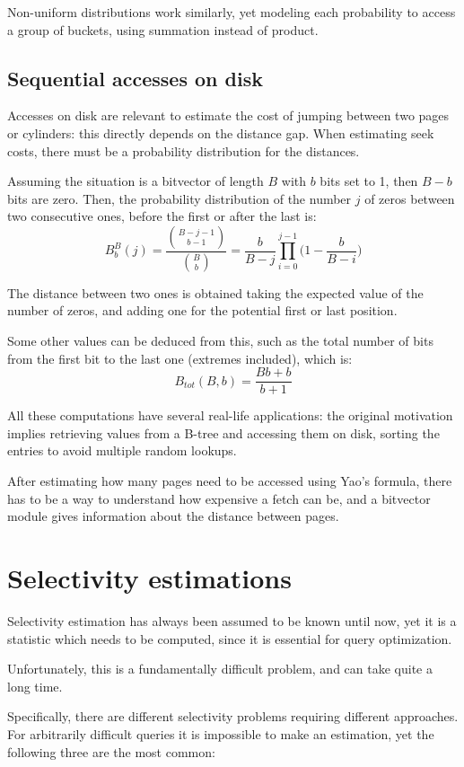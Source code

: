 Non-uniform distributions work similarly, yet modeling each probability to access a group of buckets, using summation instead of product. 

\subsection{Sequential accesses on disk}
Accesses on disk are relevant to estimate the cost of jumping between two pages or cylinders: this directly depends on the distance gap. When estimating seek costs, there must be a probability distribution for the distances.  

Assuming the situation is a bitvector of length $B$ with $b$ bits set to 1, then $B - b$ bits are zero. Then, the probability distribution of the number $j$ of zeros between two consecutive ones, before the first or after the last is:
$$B^B_b(j) = \frac{{B-j-1\choose b-1}}{{B\choose b}} = \frac{b}{B-j}\prod_{i=0}^{j-1} \Big( 1 - \frac{b}{B - i}\Big)$$

The distance between two ones is obtained taking the expected value of the number of zeros, and adding one for the potential first or last position.

Some other values can be deduced from this, such as the total number of bits from the first bit to the last one (extremes included), which is:
$$B_{tot}(B, b) = \frac{Bb + b}{b + 1}$$

All these computations have several real-life applications: the original motivation implies retrieving values from a B-tree and accessing them on disk, sorting the entries to avoid multiple random lookups. 

After estimating how many pages need to be accessed using Yao's formula, there has to be a way to understand how expensive a fetch can be, and a bitvector module gives information about the distance between pages. 


\section{Selectivity estimations}
Selectivity estimation has always been assumed to be known until now, yet it is a statistic which needs to be computed, since it is essential for query optimization.

Unfortunately, this is a fundamentally difficult problem, and can take quite a long time.

Specifically, there are different selectivity problems requiring different approaches. For arbitrarily difficult queries it is impossible to make an estimation, yet the following three are the most common:

